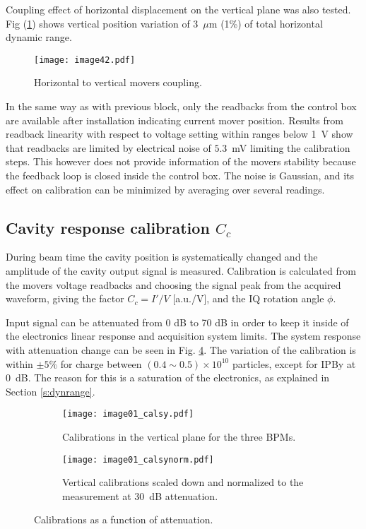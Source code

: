 Coupling effect of horizontal displacement on the vertical plane was also tested. Fig (\ref{f:PIcoupling}) shows vertical position variation of 3~$\mu$m (1\%) of total horizontal dynamic range.\par
\begin{figure}[!htb]
\centering
\texttt{[image: image42.pdf]}\caption{Horizontal to vertical movers coupling.}\label{f:PIcoupling}
\end{figure}
In the same way as with previous block, only the readbacks from the control box are available after installation indicating current mover position. Results from readback linearity with respect to voltage setting within ranges below 1~V show that readbacks are limited by electrical noise of $5.3$~mV limiting the calibration steps. This however does not provide information of the movers stability because the feedback loop is closed inside the control box. The noise is Gaussian, and its effect on calibration can be minimized by averaging over several readings.\par
\subsection{Cavity response calibration \texorpdfstring{$C_c$}{Cc}}\label{s:calibration}
During beam time the cavity position is systematically changed and the amplitude of the cavity output signal is measured. Calibration is calculated from the movers voltage readbacks and choosing the signal peak from the acquired waveform,  giving the factor $C_c=I'/V$ [a.u./V], and the IQ rotation angle $\phi$.\par
Input signal can be attenuated from 0 dB to 70 dB in order to keep it inside of the electronics linear response and acquisition system limits. The system response with attenuation change can be seen in Fig. \ref{f:calatt}. The variation of the calibration is within $\pm5\%$ for charge between $(0.4\sim0.5)\times10^{10}$ particles, except for IPBy at 0~dB. The reason for this is a saturation of the electronics, as explained in Section \ref{s:dynrange}.
\begin{figure}[!htb]
 \centering\hspace*{-0.6cm}
 \begin{subfigure}{0.4\textwidth}
  \texttt{[image: image01\_calsy.pdf]}\caption{Calibrations in the vertical plane for the three BPMs.}\label{f:calsy}
 \end{subfigure}\hspace*{1cm}
\begin{subfigure}{0.4\textwidth}
  \texttt{[image: image01\_calsynorm.pdf]}\caption{Vertical calibrations scaled down and normalized to the measurement at 30~dB attenuation.}\label{f:calsynorm}
 \end{subfigure}\caption{Calibrations as a function of attenuation.}\label{f:calatt}
\end{figure}

